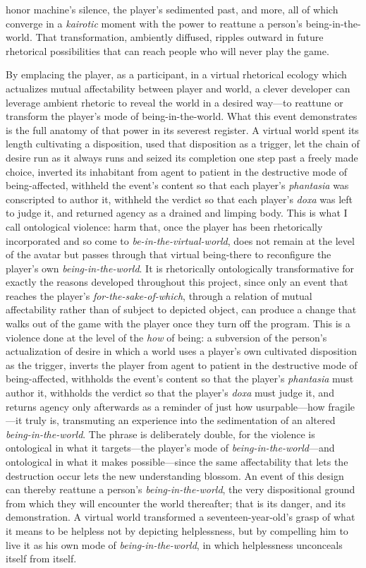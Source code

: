 honor machine's silence, the player's sedimented past, and more, all of which converge in a \textit{kairotic} moment with the power to reattune a person's being-in-the-world. That transformation, ambiently diffused, ripples outward in future rhetorical possibilities that can reach people who will never play the game.

By emplacing the player, as a participant, in a virtual rhetorical ecology which actualizes mutual affectability between player and world, a clever developer can leverage ambient rhetoric to reveal the world in a desired way---to reattune or transform the player's mode of being-in-the-world. What this event demonstrates is the full anatomy of that power in its severest register. A virtual world spent its length cultivating a disposition, used that disposition as a trigger, let the chain of desire run as it always runs and seized its completion one step past a freely made choice, inverted its inhabitant from agent to patient in the destructive mode of being-affected, withheld the event's content so that each player's \textit{phantasia} was conscripted to author it, withheld the verdict so that each player's \textit{doxa} was left to judge it, and returned agency as a drained and limping body. This is what I call ontological violence: harm that, once the player has been rhetorically incorporated and so come to \textit{be-in-the-virtual-world}, does not remain at the level of the avatar but passes through that virtual being-there to reconfigure the player's own \textit{being-in-the-world}. It is rhetorically ontologically transformative for exactly the reasons developed throughout this project, since only an event that reaches the player's \textit{for-the-sake-of-which}, through a relation of mutual affectability rather than of subject to depicted object, can produce a change that walks out of the game with the player once they turn off the program. This is a violence done at the level of the \textit{how} of being: a subversion of the person's actualization of desire in which a world uses a player's own cultivated disposition as the trigger, inverts the player from agent to patient in the destructive mode of being-affected, withholds the event's content so that the player's \textit{phantasia} must author it, withholds the verdict so that the player's \textit{doxa} must judge it, and returns agency only afterwards as a reminder of just how usurpable---how fragile---it truly is, transmuting an experience into the sedimentation of an altered \textit{being-in-the-world}. The phrase is deliberately double, for the violence is ontological in what it targets---the player's mode of \textit{being-in-the-world}---and ontological in what it makes possible---since the same affectability that lets the destruction occur lets the new understanding blossom. An event of this design can thereby reattune a person's \textit{being-in-the-world}, the very dispositional ground from which they will encounter the world thereafter; that is its danger, and its demonstration. A virtual world transformed a seventeen-year-old's grasp of what it means to be helpless not by depicting helplessness, but by compelling him to live it as his own mode of \textit{being-in-the-world}, in which helplessness unconceals itself from itself. 